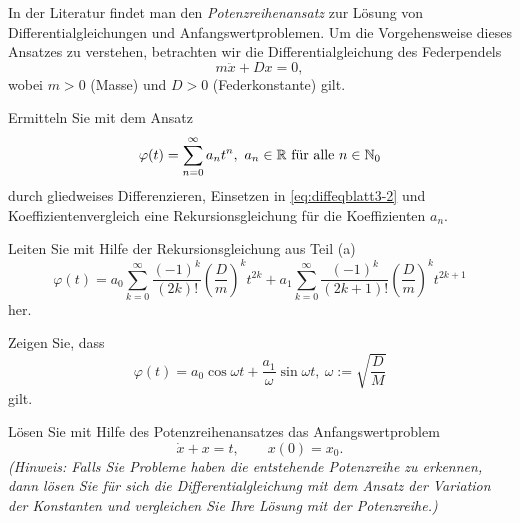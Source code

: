 \begin{Problem}
	In der Literatur findet man den \emph{Potenzreihenansatz} zur L\"{o}sung von Differentialgleichungen und Anfangswertproblemen. Um die Vorgehensweise dieses Ansatzes zu verstehen, betrachten wir die Differentialgleichung des Federpendels
	\begin{equation}\label{eq:diffeqblatt3-2}
		m\ddot{x}+Dx=0,
	\end{equation}
	wobei $m>0$ (Masse) und $D>0$ (Federkonstante) gilt.
	\begin{parts}
	\item Ermitteln Sie mit dem Ansatz
		\[
			\varphi(t)=\sum_{n=0}^{\infty} a_n t^n,~a_n\in \mathbb{R}~\text{f\"{u}r alle }n\in \mathbb{N}_0
		\] 
		durch gliedweises Differenzieren, Einsetzen in \eqref{eq:diffeqblatt3-2} und Koeffizientenvergleich eine Rekursionsgleichung f\"{u}r die Koeffizienten $a_n$.
	\item Leiten Sie mit Hilfe der Rekursionsgleichung aus Teil (a)
		\[
			\varphi(t)=a_0 \sum_{k=0}^{\infty} \frac{(-1)^k}{(2k)!}\left(\frac{D}{m}\right)^k t^{2k}+a_1 \sum_{k=0}^{\infty} \frac{(-1)^k}{(2k+1)!}\left( \frac{D}{m} \right)^k t^{2k+1}
		\]
		her.
	\item Zeigen Sie, dass
\[
\varphi(t)=a_0 \cos\omega t + \frac{a_1}{\omega}\sin \omega t,~\omega:=\sqrt{\frac{D}{M}} 
\]
gilt.
\item L\"{o}sen Sie mit Hilfe des Potenzreihenansatzes das Anfangswertproblem
	\[
		\dot{x}+x=t,\qquad x(0)=x_0
	.\] 
	\emph{(Hinweis: Falls Sie Probleme haben die entstehende Potenzreihe zu erkennen, dann lösen Sie für sich die Differentialgleichung mit dem Ansatz der Variation der Konstanten und vergleichen Sie Ihre Lösung mit der Potenzreihe.)} 
	\end{parts}
\end{Problem}
